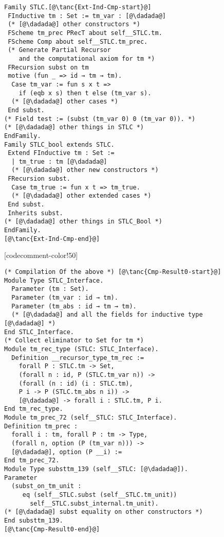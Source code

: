 \begin{figure}

\begin{minipage}{\textwidth}
\begin{multicols}{2}


\begin{lstlisting}
Family STLC.[@\tanc{Ext-Ind-Cmp-start}@]
 FInductive tm : Set := tm_var : [@\dadada@]
 (* [@\dadada@] other constructors *) 
 FScheme tm_prec PRecT about self__STLC.tm.
 FScheme Comp about self__STLC.tm_prec.
 (* Generate Partial Recursor 
    and the computational axiom for tm *)
 FRecursion subst on tm 
 motive (fun _ => id → tm → tm). 
  Case tm_var := fun s x t => 
    if (eqb x s) then t else (tm_var s).
  (* [@\dadada@] other cases *)
 End subst.
(* Field test := (subst (tm_var 0) 0 (tm_var 0)). *)
(* [@\dadada@] other things in STLC *)
EndFamily.
Family STLC_bool extends STLC.
 Extend FInductive tm : Set :=
  | tm_true : tm [@\dadada@]
  (* [@\dadada@] other new constructors *)
 FRecursion subst.
  Case tm_true := fun x t => tm_true.
  (* [@\dadada@] other extended cases *)
 End subst. 
 Inherits subst.
(* [@\dadada@] other things in STLC_Bool *)
EndFamily.
[@\tanc{Ext-Ind-Cmp-end}@]
\end{lstlisting}

[codecomment-color!50]



\begin{lstlisting}
(* Compilation Of the above *) [@\tanc{Cmp-Result0-start}@]
Module Type STLC_Interface. 
  Parameter (tm : Set).
  Parameter (tm_var : id → tm).
  Parameter (tm_abs : id → tm → tm).
  (* [@\dadada@] and all the fields for inductive type [@\dadada@] *)
End STLC_Interface.
(* Collect eliminator to Set for tm *)
Module tm_rec_type (STLC: STLC_Interface).
  Definition __recursor_type_tm_rec :=
    forall P : STLC.tm -> Set,
    (forall n : id, P (STLC.tm_var n)) ->
    (forall (n : id) (i : STLC.tm),
    P i -> P (STLC.tm_abs n i)) ->
    [@\dadada@] -> forall i : STLC.tm, P i.
End tm_rec_type.  
Module tm_prec_72 (self__STLC: STLC_Interface).
Definition tm_prec :
  forall i : tm, forall P : tm -> Type,
  (forall n, option (P (tm_var n))) ->
  [@\dadada@], option (P __i) :=
End tm_prec_72. 
Module Type substtm_139 (self__STLC: [@\dadada@]).
Parameter
  (subst_on_tm_unit :
	 eq (self__STLC.subst (self__STLC.tm_unit))
       self__STLC.subst_internal.tm_unit).
(* [@\dadada@] subst equality on other constructors *)
End substtm_139. 
[@\tanc{Cmp-Result0-end}@]
\end{lstlisting}


\end{multicols}
\end{minipage}
\end{figure}
